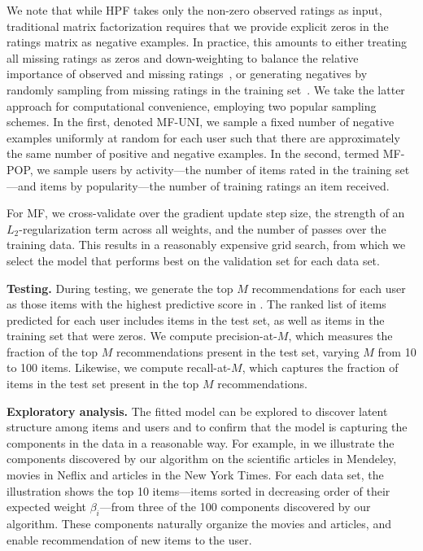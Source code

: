 We note that while HPF takes only the non-zero observed ratings as
input, traditional matrix factorization requires that we provide
explicit zeros in the ratings matrix as negative examples. In
practice, this amounts to either treating all missing ratings as zeros
and down-weighting to balance the relative importance of observed and
missing ratings~\cite{Hu:2008p9402}, or generating negatives by
randomly sampling from missing ratings in the training
set~\cite{Dror:2012a}.  We take the latter approach for computational
convenience, employing two popular sampling schemes. In the first,
denoted MF-UNI, we sample a fixed number of negative examples
uniformly at random for each user such that there are approximately
the same number of positive and negative examples. In the second,
termed MF-POP, we sample users by activity---the number of items rated
in the training set---and items by popularity---the number of training
ratings an item received.

For MF, we cross-validate over the gradient update step size, the
strength of an $L_2$-regularization term across all weights, and the
number of passes over the training data. This results in a reasonably
expensive grid search, from which we select
the model that performs best on the validation set for each data set.


{\bf Testing.} During testing, we generate the top $M$ recommendations
for each user as those items with the highest predictive score in
. The ranked list of items predicted for each user
includes items in the test set, as well as items in the training set
that were zeros. We compute precision-at-$M$, which measures the
fraction of the top $M$ recommendations present in the test set,
varying $M$ from 10 to 100 items. Likewise, we compute recall-at-$M$,
which captures the fraction of items in the test set present in the
top $M$ recommendations.




{\bf Exploratory analysis.} The fitted model can be explored to
discover latent structure among items and users and to confirm that
the model is capturing the components in the data in a reasonable
way. For example, in  we illustrate the components
discovered by our algorithm on the scientific articles in Mendeley,
movies in Neflix and articles in the New York Times. For each data
set, the illustration shows the top 10 items---items sorted in
decreasing order of their expected weight $\beta_i$---from three of
the 100 components discovered by our algorithm. These components
naturally organize the movies and articles, and enable recommendation
of new items to the user.

